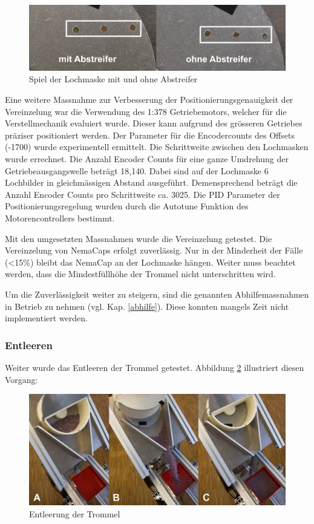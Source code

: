 \begin{figure}[H]
	\includegraphics[draft=false,width=1\textwidth]{Illustrationen/7-Inbetriebnahme_und_Kalibration/spiel_lochmaske_1.jpg}
	\caption{Spiel der Lochmaske mit und ohne Abstreifer}
	\label{fig:spiel_lochmaske}
\end{figure}

Eine weitere Massnahme zur Verbesserung der Positionierungsgenauigkeit der Vereinzelung war die Verwendung des 1:378 Getriebemotors, welcher für die Verstellmechanik evaluiert wurde. Dieser kann aufgrund des grösseren Getriebes präziser positioniert werden. Der Parameter für die Encodercounts des Offsets (-1700) wurde experimentell ermittelt. Die Schrittweite zwischen den Lochmasken wurde errechnet. Die Anzahl Encoder Counts für eine ganze Umdrehung der Getriebeausgangswelle beträgt 18,140. Dabei sind auf der Lochmaske 6 Lochbilder in gleichmässigen Abstand ausgeführt. Demensprechend beträgt die Anzahl Encoder Counts pro Schrittweite ca. 3025. Die PID Parameter der Positionierungsregelung wurden durch die Autotune Funktion des Motorencontrollers bestimmt.
\newline

Mit den umgesetzten Massnahmen wurde die Vereinzelung getestet. Die Vereinzelung von NemaCaps erfolgt zuverlässig. Nur in der Minderheit der Fälle (<15\%) bleibt das NemaCap an der Lochmaske hängen. Weiter muss beachtet werden, dass die Mindestfüllhöhe der Trommel nicht unterschritten wird.
\newline

Um die Zuverlässigkeit weiter zu steigern, sind die genannten Abhilfemassnahmen in Betrieb zu nehmen (vgl. Kap. \ref{abhilfe}). Diese konnten mangels Zeit nicht implementiert werden.
\subsubsection{Entleeren}
Weiter wurde das Entleeren der Trommel getestet. Abbildung \ref{fig:entleeren} illustriert diesen Vorgang:

\begin{figure}[H]
	\includegraphics[draft=false,width=1\textwidth]{Illustrationen/7-Inbetriebnahme_und_Kalibration/entleeren.jpg}
	\caption{Entleerung der Trommel}
	\label{fig:entleeren}
\end{figure}

